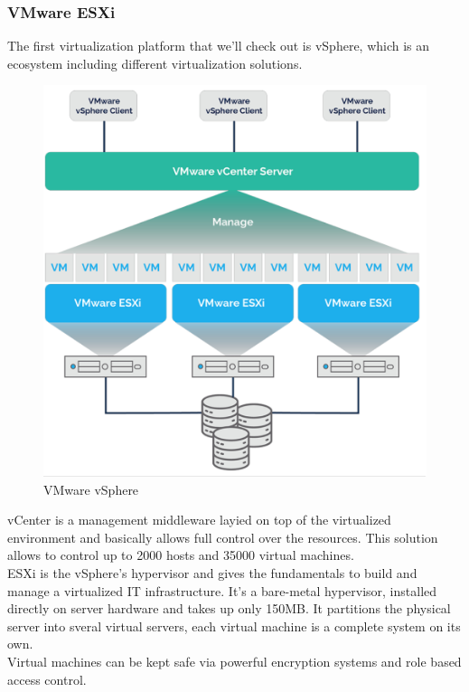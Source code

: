 \subsubsection{VMware ESXi}
The first virtualization platform that we'll check out is vSphere, which is an ecosystem including different virtualization solutions.
\begin{figure}
    \centering
    \includegraphics[scale=0.4]{Images/ESXi.png}
    \caption{VMware vSphere}
\end{figure}
vCenter is a management middleware layied on top of the virtualized environment and basically allows full control over the resources. This solution allows to control up to 2000 hosts and 35000 virtual machines. \\
ESXi is the vSphere's hypervisor and gives the fundamentals to build and manage a virtualized IT infrastructure. It's a bare-metal hypervisor, installed directly on server hardware and takes up only 150MB. It partitions the physical server into sveral virtual servers, each virtual machine is a complete system on its own. \\
Virtual machines can be kept safe via powerful encryption systems and role based access control.

